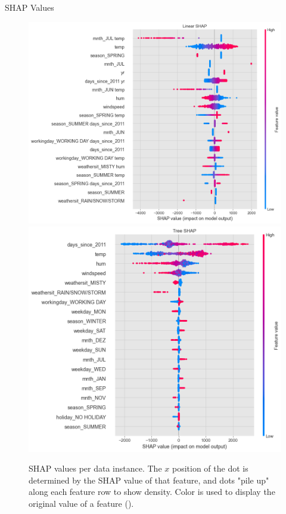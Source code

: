 \documentclass[10pt]{beamer}
\begin{document}
\begin{frame}{SHAP Values}
\begin{center}
  \begin{figure}
    \includegraphics[scale=0.22]{images/interpretable_ml_114_0.png}
    \includegraphics[scale=0.22]{images/interpretable_ml_127_0.png}
    \caption{SHAP values per data instance. The $x$ position of the dot is determined by the SHAP value of that feature, and dots "pile up" along each feature row to show density. Color is used to display the original value of a feature (\cite{NIPS2017_7062}).}
  \end{figure}
\end{center}
\end{frame}
\end{document}
